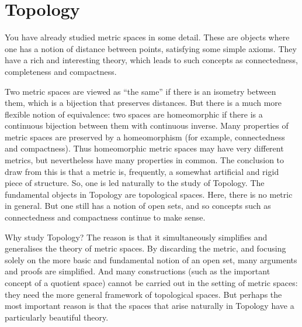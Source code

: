 \part{Topology}\label{part:topology}
You have already studied metric spaces in some detail. These are objects where one has a notion of distance between points, satisfying some simple axioms. They have a rich and interesting theory, which leads to such concepts as connectedness, completeness and
compactness.

Two metric spaces are viewed as ``the same'' if there is an isometry between them, which is a bijection that preserves distances. But there is a much more flexible notion of equivalence: two spaces are homeomorphic if there is a continuous bijection between them with continuous inverse. Many properties of metric spaces are preserved by a homeomorphism (for example, connectedness and compactness). Thus homeomorphic metric spaces may have very different metrics, but nevertheless have many properties in common. The conclusion to draw from this is that a metric is, frequently, a somewhat artificial and rigid piece of structure. So, one is led naturally to the study of Topology. The fundamental objects in Topology are topological spaces. Here, there is no metric in general. But one still has a notion of open sets, and so concepts such as connectedness and compactness continue to make sense.

Why study Topology? The reason is that it simultaneously simplifies and generalises the theory of metric spaces. By discarding the metric, and focusing solely on the more basic and fundamental notion of an open set, many arguments and proofs are simplified. And many constructions (such as the important concept of a quotient space) cannot be carried out in the setting of metric spaces: they need the more general framework of topological spaces. But perhaps the most important reason is that the spaces that arise naturally in Topology have a particularly beautiful theory.
